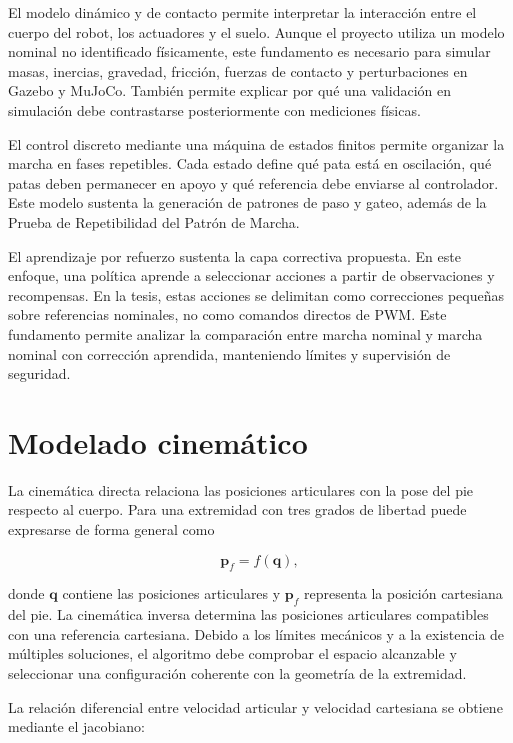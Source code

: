 El modelo dinámico y de contacto permite interpretar la interacción entre el
cuerpo del robot, los actuadores y el suelo. Aunque el proyecto utiliza un
modelo nominal no identificado físicamente, este fundamento es necesario para
simular masas, inercias, gravedad, fricción, fuerzas de contacto y perturbaciones
en Gazebo y MuJoCo. También permite explicar por qué una validación en
simulación debe contrastarse posteriormente con mediciones físicas.

El control discreto mediante una máquina de estados finitos permite organizar la
marcha en fases repetibles. Cada estado define qué pata está en oscilación, qué
patas deben permanecer en apoyo y qué referencia debe enviarse al controlador.
Este modelo sustenta la generación de patrones de paso y gateo, además de la
Prueba de Repetibilidad del Patrón de Marcha.

El aprendizaje por refuerzo sustenta la capa correctiva propuesta. En este
enfoque, una política aprende a seleccionar acciones a partir de observaciones y
recompensas. En la tesis, estas acciones se delimitan como correcciones pequeñas
sobre referencias nominales, no como comandos directos de PWM. Este fundamento
permite analizar la comparación entre marcha nominal y marcha nominal con
corrección aprendida, manteniendo límites y supervisión de seguridad.

\section{Modelado cinemático}

La cinemática directa relaciona las posiciones articulares con la pose del pie respecto al cuerpo. Para una extremidad con tres grados de libertad puede expresarse de forma general como

\begin{equation}
    \mathbf{p}_{f}=f(\mathbf{q}),
    \label{eq:cinematica-directa}
\end{equation}

donde $\mathbf{q}$ contiene las posiciones articulares y $\mathbf{p}_{f}$ representa la posición cartesiana del pie. La cinemática inversa determina las posiciones articulares compatibles con una referencia cartesiana. Debido a los límites mecánicos y a la existencia de múltiples soluciones, el algoritmo debe comprobar el espacio alcanzable y seleccionar una configuración coherente con la geometría de la extremidad.

La relación diferencial entre velocidad articular y velocidad cartesiana se obtiene mediante el jacobiano:

